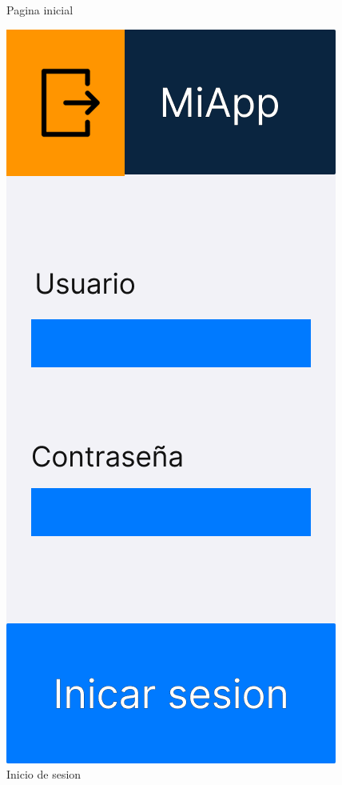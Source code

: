\begin{figure}[H]
\begin{minipage}{0.45\textwidth}
      \caption{Pagina inicial}
      \label{fig:Pagina inicial}
   \end{minipage}%
   \hspace{0.5cm}
   \begin{minipage}{0.45\textwidth}
      \centering
      \includegraphics[width=\textwidth]{fotos/Frame 22-1.png}
      \caption{Inicio de sesion}
      \label{fig:Inicio de sesion}
   \end{minipage}
\end{figure}

